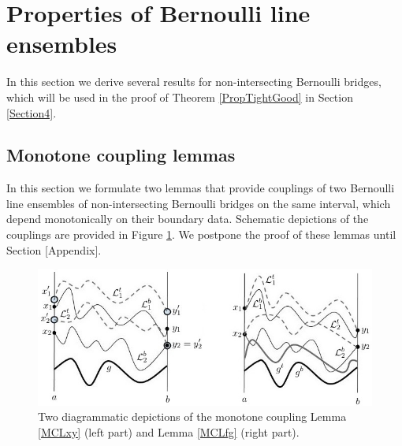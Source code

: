 %
\section{Properties of Bernoulli line ensembles}\label{Section3} In this section we derive several results for non-intersecting Bernoulli bridges, which will be used in the proof of Theorem \ref{PropTightGood} in Section \ref{Section4}.


%
\subsection{Monotone coupling lemmas}\label{Section3.1}
 In this section we formulate two lemmas that provide couplings of two Bernoulli line ensembles of non-intersecting Bernoulli bridges on the same interval, which depend monotonically on their boundary data. Schematic depictions of the couplings are provided in Figure \ref{fig:MCL}. We postpone the proof of these lemmas until Section [Appendix]. 
\begin{figure}[ht]
\begin{center}
  \includegraphics[scale = 0.8]{S2_1_new.jpg}
  \caption{Two diagrammatic depictions of the monotone coupling Lemma \ref{MCLxy} (left part) and Lemma \ref{MCLfg} (right part).}
  \label{fig:MCL}
  \end{center}
\end{figure}

